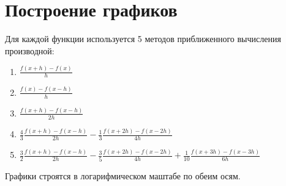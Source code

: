 \documentclass[a4paper,11.5pt]{article} %
\begin{document}
    \section{Построение графиков}
    Для каждой функции используется 5 методов приближенного вычисления производной:
    \begin{enumerate}
        \item $\frac{f(x + h) - f(x)}{h}$
        \item $\frac{f(x) - f(x - h)}{h}$
        \item $\frac{f(x + h) - f(x - h)}{2h}$
        \item $\frac{4}{3}\frac{f(x + h) - f(x - h)}{2h} - \frac{1}{3}\frac{f(x + 2h) - f(x - 2h)}{4h}$
        \item $\frac{3}{2}\frac{f(x + h) - f(x - h)}{2h} - \frac{3}{5}\frac{f(x + 2h) - f(x - 2h)}{4h} + \frac{1}{10}\frac{f(x + 3h) - f(x - 3h)}{6h}$
    \end{enumerate}

    Графики строятся в логарифмическом маштабе по обеим осям.

    \begin{figure}[H]
	\end{figure}
\end{document}
